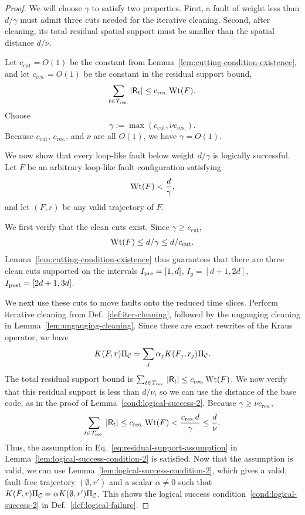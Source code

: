 \documentclass[11pt]{article}
\begin{document}
\begin{proof}
    We will choose $\gamma$ to satisfy two properties. First, a fault of weight less than $d/\gamma$ must admit three cuts needed for the iterative cleaning. Second, after cleaning, its total residual spatial support must be smaller than the spatial distance $d/\nu$.
    
    Let $c_{\mathrm{cut}}=O(1)$ be the constant from Lemma~\ref{lem:cutting-condition-existence}, and let $c_{\mathrm{res.}}=O(1)$ be the constant in the residual support bound,
    \[
    \sum_{t\in T_{\mathrm{res.}}}|\mathsf{R}_t|\leq c_{\rm{res.}}\operatorname{Wt}(F).
    \]
    Choose 
    \begin{equation}
        \gamma:= \max(c_{\mathrm{cut}}, \nu c_{\mathrm{res.}}).
        \label{def:gamma}
    \end{equation}
    Because $c_\mathrm{cut}$, $c_{\mathrm{res.}}$, and $\nu$ are all $O(1)$, we have $\gamma = O(1)$.

    We now show that every loop-like fault below weight $d/\gamma$ is logically successful.
    Let $F$ be an arbitrary loop-like fault configuration satisfying 
    \[
    \operatorname{Wt}(F)<\frac{d}{\gamma},
    \]
    and let $(F,r)$ be any valid trajectory of $F$. 

    We first verify that the clean cuts exist.
    Since $\gamma \geq c_{\mathrm{cut}}$, 
    \[\operatorname{Wt}(F)\le d/\gamma \le d/c_{\mathrm{cut}}.
    \]
    Lemma~\ref{lem:cutting-condition-existence} thus guarantees that there are three clean cuts supported on the intervals $I_{\rm pre} = [1, d]$, $I_g = [d+1, 2d]$, $I_{\rm post} = [2d+1, 3d]$.

    We next use these cuts to move faults onto the reduced time slices.
    Perform iterative cleaning from Def.~\ref{def:iter-cleaning}, followed by the ungauging cleaning in Lemma~\ref{lem:ungauging-cleaning}. Since these are exact rewrites of the Kraus operator, we have
    \[
    K(F,r)\Pi_{\mathcal{C}} = \sum_{j}\alpha_j K(F_j,r_j) \Pi_{\mathcal{C}}.
    \]
    The total residual support bound is
    $\sum_{t\in T_{\mathrm{res.}}} |\mathsf{R}_t|\le c_{\mathrm{res.}}\operatorname{Wt}(F)$. We now verify that this residual support is less than $d/\nu$, so we can use the distance of the base code, as in the proof of Lemma~\ref{cond:logical-success-2}.
    Because $\gamma \ge \nu c_{\mathrm{res.}}$, 
    \[
    \sum_{t\in T_{\mathrm{res.}}} |\mathsf{R}_t|\le c_{\mathrm{res.}}\operatorname{Wt}(F) < \frac{c_{\mathrm{res.}}d}{\gamma} \le \frac{d}{\nu}.
    \]
    Thus, the assumption in Eq.~\eqref{eq:residual-support-assumption} in Lemma~\ref{lem:logical-success-condition-2} is satisfied.
    Now that the assumption is valid, we can use Lemma~\ref{lem:logical-success-condition-2}, which gives a valid, fault-free trajectory $(\emptyset, r')$ and a scalar $\alpha\neq 0$ such that $K(F,r)\Pi_{\mathcal{C}}= \alpha K(\emptyset, r')\Pi_{\mathcal{C}}$. 
    This shows the logical success condition~\ref{cond:logical-success-2} in Def.~\ref{def:logical-failure}.


\end{proof}
\end{document}
